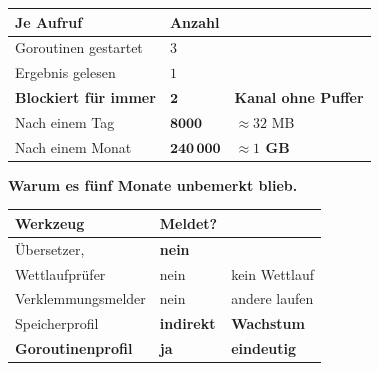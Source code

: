 \begin{merksatz}
\begin{center}
{\small
\renewcommand{\arraystretch}{1.45}
\begin{tabular}{@{}P{2.6cm}P{2.2cm}P{2.6cm}@{}}
\toprule
\textbf{Je Aufruf} & \textbf{Anzahl} & \\
\midrule
Goroutinen gestartet & $3$ & \\
Ergebnis gelesen & $1$ & \\
\textbf{Blockiert für immer} & $\mathbf{2}$ & \textcolor{akzent}{\textbf{Kanal ohne Puffer}}\\
Nach einem Tag & \textcolor{akzent}{$\mathbf{8000}$} & \textcolor{akzent}{$\approx32$ MB}\\
Nach einem Monat & \textcolor{akzent}{$\mathbf{240\,000}$} & \textcolor{akzent}{\textbf{$\approx1$ GB}}\\
\bottomrule
\end{tabular}}
\end{center}

\begin{center}
\begin{minipage}{0.88\textwidth}
\end{minipage}
\end{center}

\textbf{Warum es fünf Monate unbemerkt blieb.}

\begin{center}
\renewcommand{\arraystretch}{1.45}
\begin{tabular}{@{}P{3.0cm}P{2.2cm}P{2.6cm}@{}}
\toprule
\textbf{Werkzeug} & \textbf{Meldet?} & \\
\midrule
Übersetzer,  & \textcolor{akzent}{\textbf{nein}} & \\
Wettlaufprüfer & \textcolor{akzent}{nein} & \textcolor{akzent}{kein Wettlauf}\\
Verklemmungs\-melder & \textcolor{akzent}{nein} & \textcolor{akzent}{andere laufen}\\
Speicherprofil & \textcolor{mittel}{\textbf{indirekt}} & \textbf{Wachstum}\\
\textbf{Goroutinenprofil} & \textcolor{gruen}{\textbf{ja}} & \textcolor{gruen}{\textbf{eindeutig}}\\
\bottomrule
\end{tabular}
\end{center}

\begin{center}
\end{center}
\end{merksatz}

